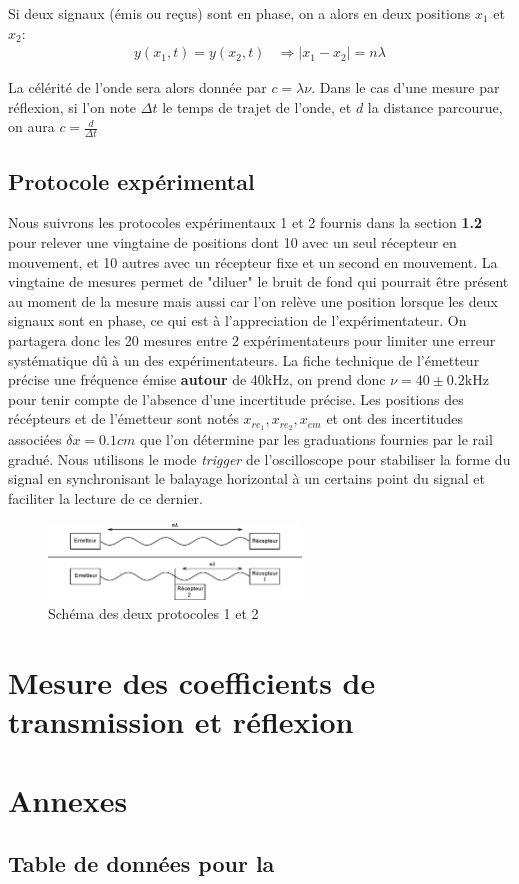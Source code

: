 \documentclass[12pt]{article}
\begin{document}
Si deux signaux (émis ou reçus) sont en phase, on a alors en deux positions $x_1$ et $x_2$:
\begin{align*}
	y(x_1, t) = y(x_2, t) & \Rightarrow |x_1 - x_2| = n\lambda
\end{align*}

La célérité de l'onde sera alors donnée par $c = \lambda \nu$. Dans le cas d'une mesure par réflexion, si l'on note $\Delta t$ le temps de trajet de l'onde, et $d$ la distance parcourue, on aura $c = \frac{d}{\Delta t}$

\subsection{Protocole expérimental}
Nous suivrons les protocoles expérimentaux 1 et 2 fournis dans la section \textbf{1.2} pour relever une vingtaine de positions dont 10 avec un seul récepteur en mouvement, et 10 autres
avec un récepteur fixe et un second en mouvement. La vingtaine de mesures permet de "diluer" le bruit de fond qui pourrait être présent au moment de la mesure mais aussi car l'on relève une position
lorsque les deux signaux sont en phase, ce qui est à l'appreciation de l'expérimentateur. On partagera donc les 20 mesures entre 2 expérimentateurs pour limiter une erreur systématique dû à un des expérimentateurs. 
La fiche technique de l'émetteur précise une fréquence émise \textbf{autour} de 40kHz, on prend donc $\nu = 40 \pm 0.2 \text{kHz}$ pour tenir compte de l'absence d'une incertitude précise. 
Les positions des récépteurs et de l'émetteur sont notés $x_{re_1}, x_{re_2}, x_{em}$ et ont des incertitudes associées
$\delta x = 0.1cm$ que l'on détermine par les graduations fournies par le rail gradué. 
Nous utilisons le mode \textit{trigger}
de l'oscilloscope pour stabiliser la forme du signal en synchronisant le balayage horizontal à un certains point du signal et faciliter la lecture de ce dernier.
\begin{figure}[!htbp]
	\centering
	\includegraphics[width=0.6\textwidth]{img/schema}
	\hfill
	\caption{Schéma des deux protocoles 1 et 2}
\end{figure}

\break
\section{Mesure des coefficients de transmission et réflexion}


\break
\section*{Annexes}
\subsection*{Table de données pour la }
\end{document}
